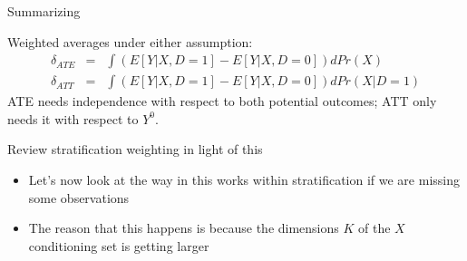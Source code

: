 \documentclass{beamer}
\begin{document}
\begin{frame}{Summarizing}


Weighted averages under either assumption:
		\begin{eqnarray*}
		\delta_{ATE} &=& \int \left(E[Y|X,D=1] - E[Y|X,D=0]\right)dPr(X) \\
		\delta_{ATT} &=& \int \left(E[Y|X,D=1] - E[Y|X,D=0]\right)dPr(X|D=1)
		\end{eqnarray*}
ATE needs independence with respect to both potential outcomes; ATT only needs it with respect to $Y^0$. 		
		
\end{frame}

\begin{frame}{Review stratification weighting in light of this}

\begin{itemize}

\item Let's now look at the way in this works within stratification if we are missing some observations
\item The reason that this happens is because the dimensions $K$ of the $X$ conditioning set is getting larger

\end{itemize}

\end{frame}
\end{document}
